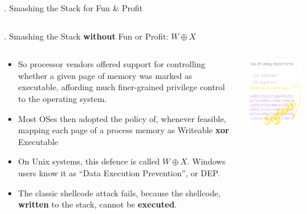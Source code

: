 \documentclass[9pt]{beamer}
\begin{document}
\begin{frame}{\theframenumber. Smashing the Stack for Fun \& Profit}
\begin{columns}
\begin{column}{.5\textwidth}
    \end{column}
  \end{columns}
  
\end{frame}
\begin{frame}{\theframenumber. Smashing the Stack \textbf{without} Fun or Profit: $W\oplus X$}
  \begin{columns}
    \begin{column}{.5\textwidth}
      \begin{itemize}
      \item<+-> So processor vendors offered support for controlling whether a given page of memory was marked as executable, affording much finer-grained privilege control to the operating system.
       
      \item<+-> Most OSes then adopted the policy of, whenever feasible, mapping each page of a process memory as Writeable \textbf{xor} Executable
      \item<+-> On Unix systems, this defence is called $W\oplus X$. Windows users know it as ``Data Execution Prevention'', or DEP.
      \item<+-> The classic shellcode attack fails, because the shellcode, \textbf{written} to the stack, cannot be \textbf{executed}.
      \end{itemize}
    \end{column}
    \begin{column}{.5\textwidth}
      \includegraphics[width=\textwidth]{../images/stack_frame_attack_w^x.png}

\end{column}
\end{columns}
\end{frame}
\end{document}
